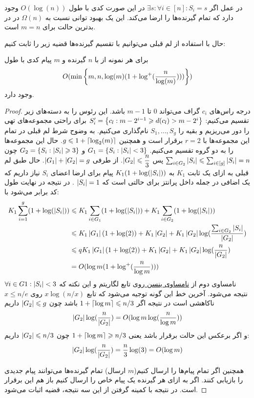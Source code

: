 \begin{remark}
	در عمل اگر 
	$\exists s: \forall i \in [n]: S_i = s$
	در این صورت کدی با طول
	$O(\log(n))$
	وجود دارد که تمام گیرنده‌ها را ارضا می‌کند. این یک بهبود توانی نسبت به
	$\Omega(n)$
	در
	\icod
	در بدترین حالت برای
	$m = n$
	است.
\end{remark}

حال با استفاده از لم قبلی می‌توانیم با تقسیم گیرنده‌ها قضیه زیر را ثابت کنیم:
\begin{theorem}
	\label{theorem:log1}
	برای هر نمونه از
	با
	$n$
	گیرنده و 
	$m$
	پیام کدی با طول
	$$O(\min\left\{ m, n, \log(m)(1 + \log^{+}(\dfrac{n}{\log(m)}) )) \right\})$$
	وجود دارد.
\end{theorem}
\begin{proof}
	درجه راس‌های 
	$c_i$
	گراف می‌تواند
	$0$
	تا
	$m - 1$
	باشد. این رئوس را به دسته‌های زیر تقسیم می‌کنیم:
	$S_{i}' = \left\{ c_l: m - 2^{i - 1} \geqslant d(c_l) > m -  2^i \right\}$
	برای راحتی مجموعه‌های تهی را دور می‌ریزیم و بقیه را
	$S_1, \ldots, S_g$
	نام‌گذاری می‌کنیم. به وضوح شرط لم قبلی در تمام این مجموعه‌ها با
	$r = 2$
	برقرار است و همچنین
	$g \leqslant 1 + \left\lceil{\log_2(m)}\right\rceil$.
 حال این مجموعه‌ها را به دو گروه تقسیم می‌کنیم.
	$G_1 = \left\{  S_i: \left|{S_i}\right| < 3 \right\}$
	و 
	$G_2 = \left\{  S_i: \left|{S_i}\right| \geqslant 3 \right\}$
	چون
	$\sum_{i \in G_2} \left|{S_i}\right| \leqslant \sum_{i \in [g]} \left|{S_i}\right| = n$
	پس
	$\left|{G_2}\right| \leqslant \dfrac{n}{3}$.
 از طرفی
	$\left|{G_1}\right| + \left|{G_2}\right| = g$.
 حال طبق لم قبلی به ازای یک ثابت
	$K_1$
	به
	$K_1(1 + \log(\left|{S_i}\right|))$
	پیام برای ارضا اعضای
	$S_i$
	نیاز داریم که یک اضافی در جمله داخل پرانتز برای حالتی است که
	$\left|{S_i}\right| = 1$
	. در نتیجه در نهایت طول کد برابر می‌شود با:
	\begin{align}
		K_1 \sum\limits_{i = 1}^{g} (1 + \log(\left|{S_i}\right|))
		& \leqslant K_1 \sum_{i \in G_1}	(1 + \log(\left|{S_i}\right|)) + K_1 \sum_{i \in G_2} (1 + \log(\left|{S_i}\right|)) \\
		& \leqslant K_1 \left|{G_1}\right| (1 + \log(2)) + K_1 \left|{G_2}\right| + K_1 \left|{G_2}\right| \log(\dfrac{\sum_{i\in G_2} \left|{S_i}\right|}{\left|{G_2}\right|}) \\
		& \leqslant q K_1 \left|{G_1}\right| (1 + \log(2)) + K_1 \left|{G_2}\right| + K_1 \left|{G_2}\right| \log(\dfrac{n}{\left|{G_2}\right|}) \\
		& = O(\log m (1 + \log^{+}(\dfrac{n}{\log m})))
	\end{align}
	نامساوی دوم از 
	\hyperref[Jensen]{
		نامساوی ینسن
	}
	روی تابع لگاریتم و این نکته که
	$\forall i \in G1: \left|{S_i}\right| < 3$
	نتیجه می‌شود. آخرین خط این گونه توجیه می‌شود که تابع
	$x \log(n/x)$
	روی
	$x \leq n/e$
	ناکاهشی است در نتیجه اگر
	$1 + \left\lceil{ \log m}\right\rceil \leqslant n/3$
	باشد چون
	$\left|{G_2}\right| \leqslant g$
	داریم
	$$\left|{G_2}\right| \log (\dfrac{n}{\left|{G_2}\right|}) = O(\log m \log (\dfrac{n}{\log m}))$$
	و اگر برعکس این حالت برقرار باشد یعنی
	$1 + \left\lceil{ \log m }\right\rceil \geqslant n/3$
	چون 
	$\left|{G_2}\right| \leqslant n/3$
	داریم:
	$$\left|{G_2}\right| \log(\dfrac{n}{\left|{G_2}\right|}) = \dfrac{n}{3} \log(3) = O(\log m)$$
	
	همچنین اگر تمام پیام‌ها را ارسال کنیم($m$
	ارسال) تمام گیرنده‌ها می‌توانند پیام جدیدی را بازیابی کنند. اگر به ازای هر گیرنده یک پیام خاص را ارسال کنیم باز هم این برقرار است. در نتیجه با کمینه گرفتن از این سه نتیجه، قضیه اثبات می‌شود.
\end{proof}
